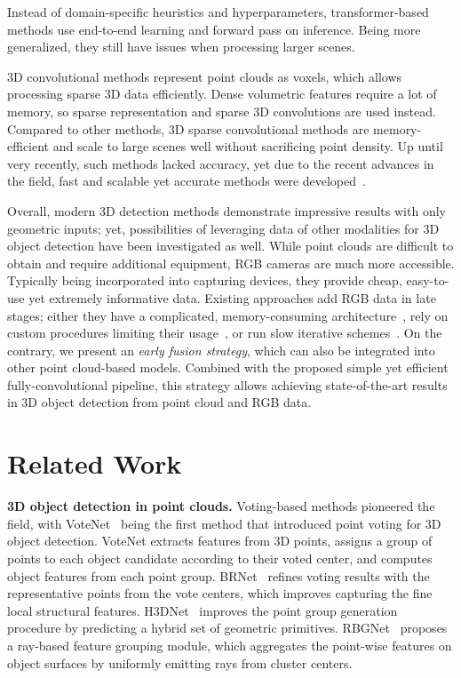 \documentclass{article}
\newcommand\inline{\noindent\textbf}
\begin{document}
Instead of domain-specific heuristics and hyperparameters, transformer-based methods use end-to-end learning and forward pass on inference. Being more generalized, they still have issues when processing larger scenes. 

3D convolutional methods represent point clouds as voxels, which allows processing sparse 3D data efficiently. Dense volumetric features require a lot of memory, so sparse representation and sparse 3D convolutions are used instead. Compared to other methods, 3D sparse convolutional methods are memory-efficient and scale to large scenes well without sacrificing point density. Up until very recently, such methods lacked accuracy, yet due to the recent advances in the field, fast and scalable yet accurate methods were developed~\cite{rukhovich2022fcaf3d}.

Overall, modern 3D detection methods demonstrate impressive results with only geometric inputs; yet, possibilities of leveraging data of other modalities for 3D object detection have been investigated as well. While point clouds are difficult to obtain and require additional equipment, RGB cameras are much more accessible. Typically being incorporated into capturing devices, they provide cheap, easy-to-use yet extremely informative data. 
Existing approaches add RGB data in late stages; either they have a complicated, memory-consuming architecture~\cite{rukhovich2021imvoxelnet}, rely on custom procedures limiting their usage~\cite{park2021multimodal}, or run slow iterative schemes~\cite{wang2022multimodal}. On the contrary, we present an \textit{early fusion strategy}, which can also be integrated into other point cloud-based models. Combined with the proposed simple yet efficient fully-convolutional pipeline, this strategy allows achieving state-of-the-art results in 3D object detection from point cloud and RGB data.

\section{Related Work}
\label{sec:related}

\inline{3D object detection in point clouds.} Voting-based methods pioneered the field, with VoteNet~\cite{qi2019votenet} being the first method that introduced point voting for 3D object detection. VoteNet extracts features from 3D points, assigns a group of points to each object candidate according to their voted center, and computes object features from each point group. BRNet~\cite{cheng2021brnet} refines voting results with the representative points from the vote centers, which improves capturing the fine local structural features. 
H3DNet~\cite{zhang2020h3dnet} improves the point group generation procedure by predicting a hybrid set of geometric primitives. 
RBGNet~\cite{wang2022rbgnet} proposes a ray-based feature grouping module, which aggregates the point-wise features on object surfaces by uniformly emitting rays from cluster centers. 
\end{document}

